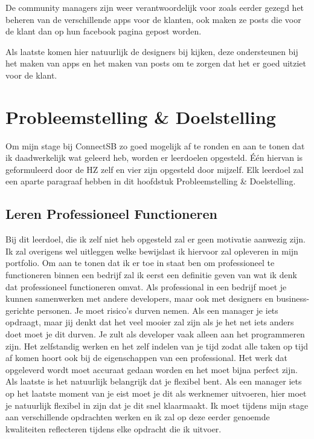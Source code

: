 \documentclass{article}
\begin{document}
De community managers zijn weer verantwoordelijk voor zoals eerder gezegd het beheren van de verschillende apps voor de klanten, ook maken ze posts die voor de klant dan op hun facebook pagina gepost worden.

Als laatste komen hier natuurlijk de designers bij kijken, deze ondersteunen bij het maken van apps en het maken van posts om te zorgen dat het er goed uitziet voor de klant.

\clearpage



\section{Probleemstelling \& Doelstelling}
Om mijn stage bij ConnectSB zo goed mogelijk af te ronden en aan te tonen dat ik daadwerkelijk wat geleerd heb, worden er leerdoelen opgesteld. Één hiervan is geformuleerd door de HZ zelf en vier zijn opgesteld door mijzelf. Elk leerdoel zal een aparte paragraaf hebben in dit hoofdstuk Probleemstelling & Doelstelling.

\subsection{Leren Professioneel Functioneren}
Bij dit leerdoel, die ik zelf niet heb opgesteld zal er geen motivatie aanwezig zijn. Ik zal overigens wel uitleggen welke bewijslast ik hiervoor zal opleveren in mijn portfolio. 
Om aan te tonen dat ik er toe in staat ben om professioneel te functioneren binnen een bedrijf zal ik eerst een definitie geven van wat ik denk dat professioneel functioneren omvat. Als professional in een bedrijf moet je kunnen samenwerken met andere developers, maar ook met designers en business-gerichte personen. Je moet risico's durven nemen. Als een manager je iets opdraagt, maar jij denkt dat het veel mooier zal zijn als je het net iets anders doet moet je dit durven. Je zult als developer vaak alleen aan het programmeren zijn. Het zelfstandig werken en het zelf indelen van je tijd zodat alle taken op tijd af komen hoort ook bij de eigenschappen van een professional. Het werk dat opgeleverd wordt moet accuraat gedaan worden en het moet bijna perfect zijn. 
Als laatste is het natuurlijk belangrijk dat je flexibel bent. Als een manager iets op het laatste moment van je eist moet je dit als werknemer uitvoeren, hier moet je natuurlijk flexibel in zijn dat je dit snel klaarmaakt.
Ik moet tijdens mijn stage aan verschillende opdrachten werken en ik zal op deze eerder genoemde kwaliteiten reflecteren tijdens elke opdracht die ik uitvoer.
\end{document}
